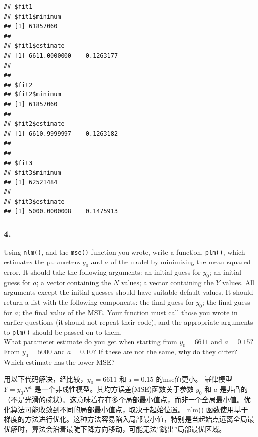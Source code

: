 \documentclass[
]{article}
\begin{document}
\begin{verbatim}
## $fit1
## $fit1$minimum
## [1] 61857060
## 
## $fit1$estimate
## [1] 6611.0000000    0.1263177
## 
## 
## $fit2
## $fit2$minimum
## [1] 61857060
## 
## $fit2$estimate
## [1] 6610.9999997    0.1263182
## 
## 
## $fit3
## $fit3$minimum
## [1] 62521484
## 
## $fit3$estimate
## [1] 5000.0000008    0.1475913
\end{verbatim}

\subsubsection{4.}\label{section-3}

Using \texttt{nlm()}, and the \texttt{mse()} function you wrote, write a
function, \texttt{plm()}, which estimates the parameters \(y_0\) and
\(a\) of the model by minimizing the mean squared error. It should take
the following arguments: an initial guess for \(y_0\); an initial guess
for \(a\); a vector containing the \(N\) values; a vector containing the
\(Y\) values. All arguments except the initial guesses should have
suitable default values. It should return a list with the following
components: the final guess for \(y_0\); the final guess for \(a\); the
final value of the MSE. Your function must call those you wrote in
earlier questions (it should not repeat their code), and the appropriate
arguments to \texttt{plm()} should be passed on to them.\\
What parameter estimate do you get when starting from \(y_0 = 6611\) and
\(a = 0.15\)? From \(y_0 = 5000\) and \(a = 0.10\)? If these are not the
same, why do they differ? Which estimate has the lower MSE?

用以下代码解决，经比较，\(y_0 = 6611\) 和 \(a = 0.15\) 的mse值更小。
幂律模型 \(Y = y_0 N^a\) 是一个非线性模型。其均方误差(MSE)函数关于参数
\(y_0\) 和 \(a\)
是非凸的（不是光滑的碗状）。这意味着存在多个局部最小值点，而非一个全局最小值。优化算法可能收敛到不同的局部最小值点，取决于起始位置。
nlm()
函数使用基于梯度的方法进行优化。这种方法容易陷入局部最小值，特别是当起始点远离全局最优解时，算法会沿着最陡下降方向移动，可能无法''跳出''局部最优区域。
\end{document}

